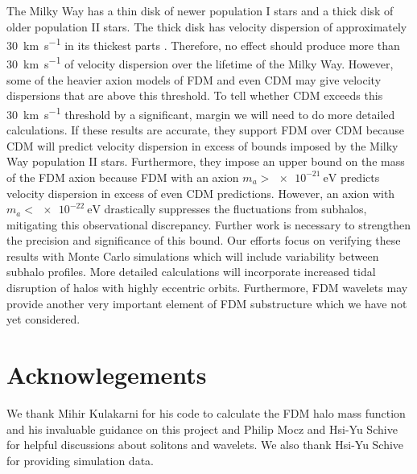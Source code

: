\documentclass[usenatbib]{mnras}
\newcommand{\poweV}[1]{\SI{e#1}{\electronvolt}}
\begin{document}
	The Milky Way has a thin disk of newer population I stars and a thick disk of older population II stars. The thick disk has velocity dispersion of approximately \SI{30}{\kilo\meter\per\second} in its thickest parts \citep{milky_way}. Therefore, no effect should produce more than \SI{30}{\kilo\meter\per\second} of velocity dispersion over the lifetime of the Milky Way. However, some of the heavier axion models of FDM and even CDM may give velocity dispersions that are above this threshold. To tell whether CDM exceeds this \SI{30}{\kilo\meter\per\second} threshold by a significant, margin we will need to do more detailed calculations. If these results are accurate, they support FDM over CDM because CDM will predict velocity dispersion in excess of bounds imposed by the Milky Way population II stars. Furthermore, they impose an upper bound on the mass of the FDM axion because FDM with an axion $m_a > \poweV{-21}$ predicts velocity dispersion in excess of even CDM predictions. However, an axion with $m_a < \poweV{-22}$ drastically suppresses the fluctuations from subhalos, mitigating this observational discrepancy. Further work is necessary to strengthen the precision and significance of this bound. Our efforts focus on verifying these results with Monte Carlo simulations which will include variability between subhalo profiles. More detailed calculations will incorporate increased tidal disruption of halos with highly eccentric orbits.  Furthermore, FDM wavelets may provide another very important element of FDM substructure which we have not yet considered.


\section*{Acknowlegements}
We thank Mihir Kulakarni for his code to calculate the FDM halo mass function and his invaluable guidance on this project and Philip Mocz and Hsi-Yu Schive for helpful discussions about solitons and wavelets. We also thank Hsi-Yu Schive for providing simulation data. 




 
\end{document}
